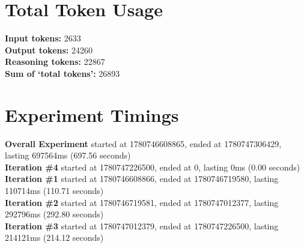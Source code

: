 \documentclass{article}
\begin{document}
\section*{Total Token Usage}
\textbf{Input tokens: }2633
\\\textbf{Output tokens: }24260
\\\textbf{Reasoning tokens: }22867
\\\textbf{Sum of `total tokens': }26893
\section*{Experiment Timings}
\textbf{Overall Experiment} started at 1780746608865, ended at 1780747306429, lasting 697564ms (697.56 seconds)
\\\textbf{Iteration \#4} started at 1780747226500, ended at 0, lasting 0ms (0.00 seconds)
\\\textbf{Iteration \#1} started at 1780746608866, ended at 1780746719580, lasting 110714ms (110.71 seconds)
\\\textbf{Iteration \#2} started at 1780746719581, ended at 1780747012377, lasting 292796ms (292.80 seconds)
\\\textbf{Iteration \#3} started at 1780747012379, ended at 1780747226500, lasting 214121ms (214.12 seconds)
\end{document}

